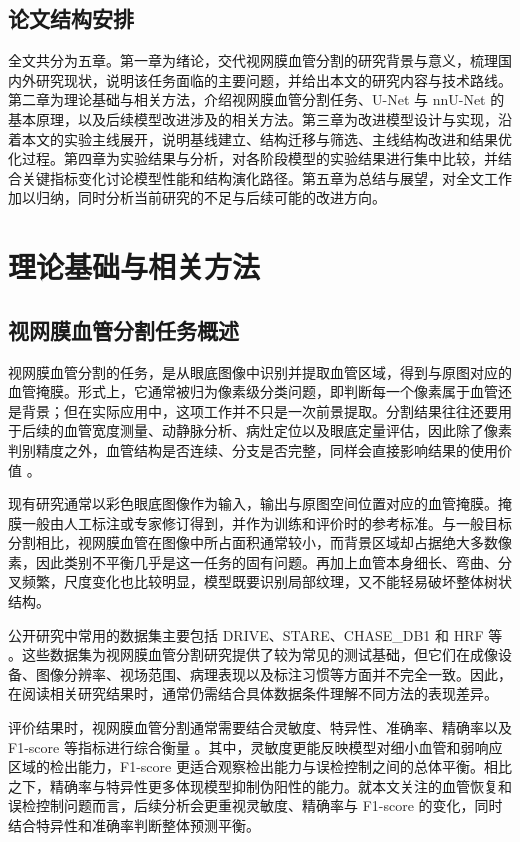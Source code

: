 \documentclass[a4paper,12pt]{article}
\begin{document}
\subsection{论文结构安排}
全文共分为五章。第一章为绪论，交代视网膜血管分割的研究背景与意义，梳理国内外研究现状，说明该任务面临的主要问题，并给出本文的研究内容与技术路线。第二章为理论基础与相关方法，介绍视网膜血管分割任务、U-Net 与 nnU-Net 的基本原理，以及后续模型改进涉及的相关方法。第三章为改进模型设计与实现，沿着本文的实验主线展开，说明基线建立、结构迁移与筛选、主线结构改进和结果优化过程。第四章为实验结果与分析，对各阶段模型的实验结果进行集中比较，并结合关键指标变化讨论模型性能和结构演化路径。第五章为总结与展望，对全文工作加以归纳，同时分析当前研究的不足与后续可能的改进方向。

\section{理论基础与相关方法}

\subsection{视网膜血管分割任务概述}
视网膜血管分割的任务，是从眼底图像中识别并提取血管区域，得到与原图对应的血管掩膜。形式上，它通常被归为像素级分类问题，即判断每一个像素属于血管还是背景；但在实际应用中，这项工作并不只是一次前景提取。分割结果往往还要用于后续的血管宽度测量、动静脉分析、病灶定位以及眼底定量评估，因此除了像素判别精度之外，血管结构是否连续、分支是否完整，同样会直接影响结果的使用价值 \cite{staal2004drive,hoover2000locating}。

现有研究通常以彩色眼底图像作为输入，输出与原图空间位置对应的血管掩膜。掩膜一般由人工标注或专家修订得到，并作为训练和评价时的参考标准。与一般目标分割相比，视网膜血管在图像中所占面积通常较小，而背景区域却占据绝大多数像素，因此类别不平衡几乎是这一任务的固有问题。再加上血管本身细长、弯曲、分叉频繁，尺度变化也比较明显，模型既要识别局部纹理，又不能轻易破坏整体树状结构。

公开研究中常用的数据集主要包括 DRIVE、STARE、CHASE\_DB1 和 HRF 等 \cite{staal2004drive,hoover2000locating,chasedb12013,budai2013robust}。这些数据集为视网膜血管分割研究提供了较为常见的测试基础，但它们在成像设备、图像分辨率、视场范围、病理表现以及标注习惯等方面并不完全一致。因此，在阅读相关研究结果时，通常仍需结合具体数据条件理解不同方法的表现差异。

评价结果时，视网膜血管分割通常需要结合灵敏度、特异性、准确率、精确率以及 F1-score 等指标进行综合衡量 \cite{staal2004drive,hoover2000locating}。其中，灵敏度更能反映模型对细小血管和弱响应区域的检出能力，F1-score 更适合观察检出能力与误检控制之间的总体平衡。相比之下，精确率与特异性更多体现模型抑制伪阳性的能力。就本文关注的血管恢复和误检控制问题而言，后续分析会更重视灵敏度、精确率与 F1-score 的变化，同时结合特异性和准确率判断整体预测平衡。
\end{document}
